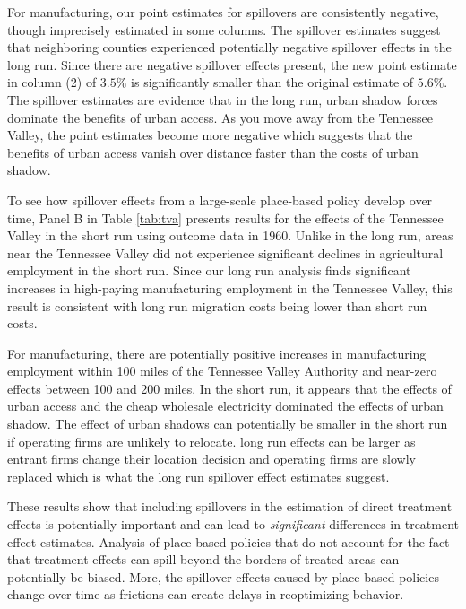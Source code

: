\documentclass[11pt]{article}
\begin{document}
For manufacturing, our point estimates for spillovers are consistently negative, though imprecisely estimated in some columns. The spillover estimates suggest that neighboring counties experienced potentially negative spillover effects in the long run. Since there are negative spillover effects present, the new point estimate in column (2) of $3.5\%$ is significantly smaller than the original estimate of $5.6\%$. The spillover estimates are evidence that in the long run, urban shadow forces dominate the benefits of urban access. As you move away from the Tennessee Valley, the point estimates become more negative which suggests that the benefits of urban access vanish over distance faster than the costs of urban shadow.

To see how spillover effects from a large-scale place-based policy develop over time, Panel B in Table \ref{tab:tva} presents results for the effects of the Tennessee Valley in the short run using outcome data in 1960. Unlike in the long run, areas near the Tennessee Valley did not experience significant declines in agricultural employment in the short run. Since our long run analysis finds significant increases in high-paying manufacturing employment in the Tennessee Valley, this result is consistent with long run migration costs being lower than short run costs.

For manufacturing, there are potentially positive increases in manufacturing employment within 100 miles of the Tennessee Valley Authority and near-zero effects between 100 and 200 miles. In the short run, it appears that the effects of urban access and the cheap wholesale electricity dominated the effects of urban shadow. The effect of urban shadows can potentially be smaller in the short run if operating firms are unlikely to relocate. long run effects can be larger as entrant firms change their location decision and operating firms are slowly replaced which is what the long run spillover effect estimates suggest.

These results show that including spillovers in the estimation of direct treatment effects is potentially important and can lead to \emph{significant} differences in treatment effect estimates. Analysis of place-based policies that do not account for the fact that treatment effects can spill beyond the borders of treated areas can potentially be biased. More, the spillover effects caused by place-based policies change over time as frictions can create delays in reoptimizing behavior. 

\end{document}
